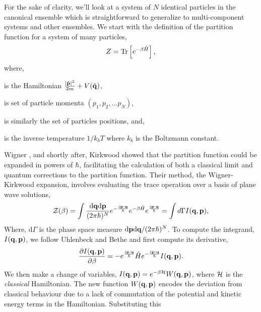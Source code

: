 For the sake of clarity, we'll look at a system of $N$ identical particles in
the canonical ensemble which is straightforward to generalize to
multi-component systems and other ensembles. We start with the definition of
the partition function for a system of many particles,  
%
\begin{equation}
    \label{eq:quantum_partition}
    Z = \mathrm{Tr}\left[ e^{-\beta\hat{H}} \right], 
\end{equation} 
%
where, 
%
\begin{description}[align=right, labelwidth=1cm]
    \item[$\hat{H}$]{ is the Hamiltonian $\frac{\vert\hat{\mathbf{p}}\vert^2}{2m} +
        V(\hat{\mathbf{q}})$, 
    }
    \item[$\p$] is set of particle momenta $(p_1, p_2, ...p_N)$,
    \item[$\q$] is similarly the set of particles positions, and,
    \item[$\beta$]{ is the inverse temperature $1 / k_b T$ where $k_b$ is the
        Boltzmann constant.
    }  
\end{description}
%
Wigner \cite{PhysRev.40.749}, and shortly after, Kirkwood \cite{PhysRev.44.31}
showed that the partition function could be expanded in powers of $\hbar$,
facilitating the calculation of both a classical limit and quantum corrections
to the partition function.  Their method, the Wigner-Kirkwood expansion,
involves evaluating the trace operation over a basis of plane wave solutions,
%
\begin{equation}
    \mathcal{Z}(\beta) = \int \frac{\mathrm{d}\mathbf{q} \mathrm{d}\mathbf{p}}{(2\pi \hbar)^N}
        e^{-\frac{i\mathbf{p}\cdot\mathbf{q}}{\hbar}} 
        e^{-\beta \hat{H}} e^{\frac{i\mathbf{p}\cdot\mathbf{q}}{\hbar}} 
        = \int d\Gamma I(\mathbf{q}, \mathbf{p}), 
        \label{plane_wave_trace}
\end{equation}
%
Where, $\mathrm{d}\Gamma$ is the phase space measure
$\mathrm{d}\mathbf{p}\mathrm{d}\mathbf{q}/(2\pi\hbar)^N$.  To compute the integrand, $I(\mathbf{q},
\mathbf{p})$, we follow Uhlenbeck and Bethe \cite{Uhlenbeck1936729} and first compute
its derivative,
%
\begin{equation}
    \frac{\partial I(\mathbf{q}, \mathbf{p})}{\partial \beta} = -e^{\frac{i\mathbf{p}\cdot\mathbf{q}}{\hbar}}\hat{H}e^{-\frac{i\mathbf{p}\cdot\mathbf{q}}{\hbar}} I(\mathbf{q}, \mathbf{p}).
     \label{I_deriv}
\end{equation}
%
We then make a change of variables, $I(\mathbf{q}, \mathbf{p}) = e^{-\beta\mathcal{H}}W(\mathbf{q}, \mathbf{p})$,
where $\mathcal{H}$ is the {\it classical} Hamiltonian. The new function $W(\mathbf{q}, \mathbf{p})$ encodes
the deviation from classical behaviour due to a lack of commutation of the
potential and kinetic energy terms in the Hamiltonian. Substituting this 

